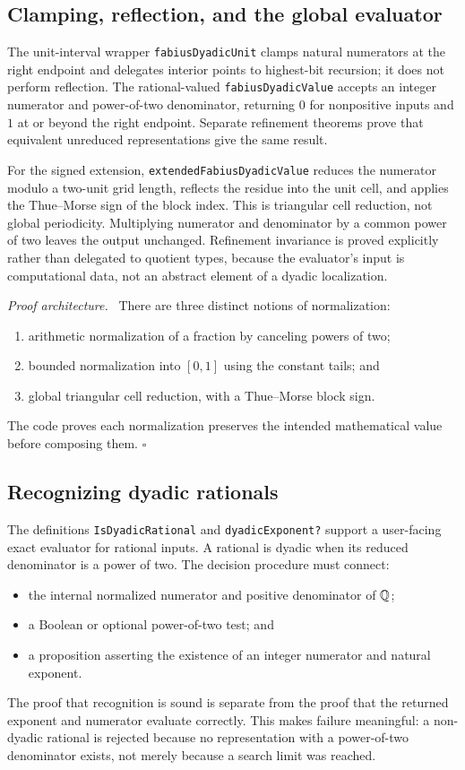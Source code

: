 \documentclass[11pt,oneside]{article}
\theoremstyle{definition}
\theoremstyle{remark}
\newenvironment{proofidea}{\par\smallskip\noindent\textit{Proof architecture.}\ }{\hfill$\square$\par\smallskip}
\begin{document}
\subsection{Clamping, reflection, and the global evaluator}
The unit-interval wrapper \nolinkurl{fabiusDyadicUnit} clamps natural numerators at the right endpoint and delegates interior points to highest-bit recursion; it does not perform reflection.  The rational-valued \nolinkurl{fabiusDyadicValue} accepts an integer numerator and power-of-two denominator, returning \(0\) for nonpositive inputs and \(1\) at or beyond the right endpoint.  Separate refinement theorems prove that equivalent unreduced representations give the same result.

For the signed extension, \nolinkurl{extendedFabiusDyadicValue} reduces the numerator modulo a two-unit grid length, reflects the residue into the unit cell, and applies the Thue--Morse sign of the block index.  This is triangular cell reduction, not global periodicity.  Multiplying numerator and denominator by a common power of two leaves the output unchanged.  Refinement invariance is proved explicitly rather than delegated to quotient types, because the evaluator's input is computational data, not an abstract element of a dyadic localization.

\begin{proofidea}
There are three distinct notions of normalization:
\begin{enumerate}
  \item arithmetic normalization of a fraction by canceling powers of two;
  \item bounded normalization into \([0,1]\) using the constant tails; and
  \item global triangular cell reduction, with a Thue--Morse block sign.
\end{enumerate}
The code proves each normalization preserves the intended mathematical value before composing them.
\end{proofidea}

\subsection{Recognizing dyadic rationals}
The definitions \nolinkurl{IsDyadicRational} and \nolinkurl{dyadicExponent?} support a user-facing exact evaluator for rational inputs.  A rational is dyadic when its reduced denominator is a power of two.  The decision procedure must connect:
\begin{itemize}
  \item the internal normalized numerator and positive denominator of \(\mathbb{Q}\);
  \item a Boolean or optional power-of-two test; and
  \item a proposition asserting the existence of an integer numerator and natural exponent.
\end{itemize}
The proof that recognition is sound is separate from the proof that the returned exponent and numerator evaluate correctly.  This makes failure meaningful: a non-dyadic rational is rejected because no representation with a power-of-two denominator exists, not merely because a search limit was reached.
\end{document}
